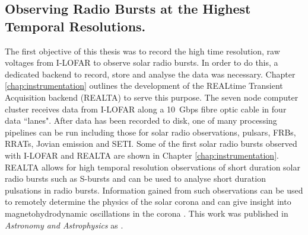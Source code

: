 \subsection{Observing Radio Bursts at the Highest Temporal Resolutions.}
The first objective of this thesis was to record the high time resolution, raw voltages from I-LOFAR to observe solar radio bursts.
In order to do this, a dedicated backend to record, store and analyse the data was necessary. Chapter \ref{chap:instrumentation} outlines the development of the REALtime Transient Acquisition backend (REALTA) to serve this purpose. The seven node computer cluster receives data from I-LOFAR along a 10~Gbps fibre optic cable in four data ``lanes". After data has been recorded to disk, one of many processing pipelines can be run including those for solar radio observations, pulsars, FRBs, RRATs, Jovian emission and SETI. Some of the first solar radio bursts observed with I-LOFAR and REALTA are shown in Chapter \ref{chap:instrumentation}. REALTA allows for high temporal resolution observations of short duration solar radio bursts such as S-bursts and can be used to analyse short duration pulsations in radio bursts. Information gained from such observations can be used to remotely determine the physics of the solar corona \citep{Morosan2015, Clarke2019} and can give insight into magnetohydrodynamic oscillations in the corona \citep{Carley2019}.  This work was published in \textit{Astronomy and Astrophysics} as  \citep{Murphy2021b}.

